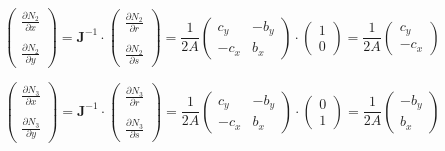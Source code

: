 \[
\left(
\begin{array}{c}
\frac{\partial N_2}{\partial x} \\ \\
\frac{\partial N_2}{\partial y}
\end{array}
\right)
=
{\bm J}^{-1}
\cdot
\left(
\begin{array}{c}
\frac{\partial N_2}{\partial r} \\ \\
\frac{\partial N_2}{\partial s}
\end{array}
\right)
=
\frac{1}{2A}
\left(
\begin{array}{cc}
c_y& -b_y \\
-c_x & b_x
\end{array}
\right)
\cdot
\left(
\begin{array}{c}
1 \\ 0
\end{array}
\right)
=
\frac{1}{2A} 
\left(
\begin{array}{c}
c_y \\ -c_x
\end{array}
\right)
\]



\[
\left(
\begin{array}{c}
\frac{\partial N_3}{\partial x} \\ \\
\frac{\partial N_3}{\partial y}
\end{array}
\right)
=
{\bm J}^{-1}
\cdot
\left(
\begin{array}{c}
\frac{\partial N_3}{\partial r} \\ \\
\frac{\partial N_3}{\partial s}
\end{array}
\right)
=
\frac{1}{2A}
\left(
\begin{array}{cc}
c_y& -b_y \\
-c_x & b_x
\end{array}
\right)
\cdot
\left(
\begin{array}{c}
0 \\ 1 
\end{array}
\right)
=
\frac{1}{2A} 
\left(
\begin{array}{c}
-b_y \\  b_x
\end{array}
\right)
\]











